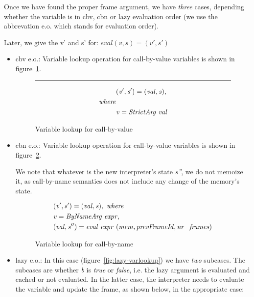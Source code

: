 \documentclass[diploma]{softlab-thesis}
\begin{document}
Once we have found the proper frame argument, we have \textit{three} cases, depending whether the variable is in cbv, cbn or lazy 
evaluation order (we use the abbrevation e.o. which stands for evaluation order). 

Later, we give the v' and s' for:
  $ \mathit{eval (v, s) = (v', s')} $

  \begin{itemize}
    \item cbv e.o.: Variable lookup operation for call-by-value 
          variables is shown in figure~\ref{fig:cbv-varLookup}.
      \begin{figure}[t]
      \hrule
        \begin{align*}
           & \mathit{(v', s') = (val, s),} \\
           \mathit{where} \\ 
           & \mathit{v = StrictArg \hfill\ val}
        \end{align*}
      \caption{Variable lookup for call-by-value\label{fig:cbv-varLookup}}
      \end{figure}
    \item cbn e.o.: Variable lookup operation for call-by-value 
    variables is shown in figure~\ref{fig:cbn-varLookup}.

    We note that whatever is the new interpreter's state \textit{s''}, we do not memoize it, as call-by-name semantics 
    does not include any change of the memory's state.

    \begin{figure}[t]
      \begin{align*}
        & \mathit{ (v', s') = (val, s), \hfill\ where } \\
        & \mathit{ v = ByNameArg \hfill\ expr, } \\
        & \mathit{(val, s'') = eval \hfill\ expr \hfill\ (mem, prevFrameId, nr\_frames)} \\
      \end{align*}
    \caption{Variable lookup for call-by-name\label{fig:cbn-varLookup}}
    \end{figure}      

    \item lazy e.o.: In this case (figure~\ref{fig:lazy-varlookup}) we have \textit{two} subcases.
    The subcases are whether \textit{b} is \textit{true} or \textit{false}, i.e. the lazy argument is evaluated and cached or
    not evaluated. In the latter case, the interpreter needs to evaluate the variable and update the frame, as shown below,
    in the appropriate case:


\end{itemize}
\end{document}
